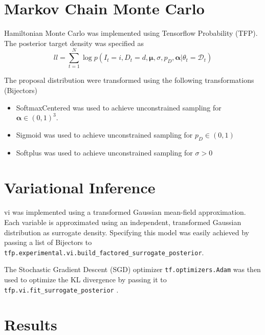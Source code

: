 \section{Markov Chain Monte Carlo}
Hamiltonian Monte Carlo was implemented using Tensorflow Probability (TFP). The posterior target density was specified as 
\begin{equation}
    ll = \sum_{t=1}^{N}\log p(I_t=i, D_t=d, \boldsymbol{\mu}, \sigma, p_D, \boldsymbol{\alpha} | \theta_t = \mathcal{D}_t)
\end{equation}

The proposal distribution were transformed using the following transformations (Bijectors)

\begin{itemize}
\item SoftmaxCentered was used to achieve unconstrained sampling for $\boldsymbol{\alpha} \in (0, 1)^3$.
\item Sigmoid was used to achieve unconstrained sampling for $p_D \in (0, 1)$
\item Softplus was used to achieve unconstrained sampling for $\sigma > 0$
\end{itemize}

\section{Variational Inference}

\acrshort{vi} was implemented using a transformed Gaussian mean-field approximation. Each variable is approximated using an independent, transformed Gaussian distribution as surrogate density. Specifying this model was easily achieved by passing a list of Bijectors to \texttt{tfp.experimental.vi.build\_factored\_surrogate\_posterior}. 

The Stochastic Gradient Descent (SGD) optimizer \texttt{tf.optimizers.Adam} was then used to optimize the KL divergence by passing it to \texttt{tfp.vi.fit\_surrogate\_posterior} \cite{tensorflow2015-whitepaper}. 

\section{Results}